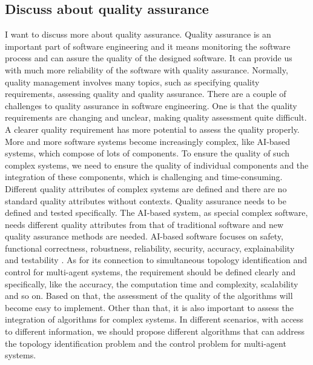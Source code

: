 \documentclass[11pt]{article}
\begin{document}
\subsection*{Discuss about quality assurance}
I want to discuss more about quality assurance. Quality assurance is an important part of software engineering and it means monitoring the software process and can assure the quality of the designed software. It can provide us with much more reliability of the software with quality assurance. Normally, quality management involves many topics, such as specifying quality requirements, assessing quality and quality assurance.  There are a couple of challenges to quality assurance in software engineering. One is that the quality requirements are changing and unclear, making quality assessment quite difficult. A clearer quality requirement has more potential to assess the quality properly. More and more software systems become increasingly complex, like AI-based systems, which compose of lots of components. To ensure the quality of such complex systems, we need to ensure the quality of individual components and the integration of these components, which is challenging and time-consuming. Different quality attributes of complex systems are defined and there are no standard quality attributes without contexts. Quality assurance needs to be defined and tested specifically. The AI-based system, as special complex software, needs different quality attributes from that of traditional software and new quality assurance methods are needed. AI-based software focuses on safety, functional correctness, robustness, reliability, security, accuracy, explainability and testability \cite{martinez2022software}. As for its connection to simultaneous topology identification and control for multi-agent systems, the requirement should be defined clearly and specifically, like the accuracy, the computation time and complexity, scalability and so on. Based on that, the assessment of the quality of the algorithms will become easy to implement. Other than that, it is also important to assess the integration of algorithms for complex systems. In different scenarios, with access to different information, we should propose different algorithms that can address the topology identification problem and the control problem for multi-agent systems. 

\\
\end{document}
